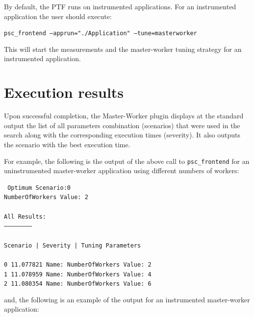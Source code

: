 \documentclass[11pt,a4paper, oneside]{book} %
\newenvironment{code}%
{
\addtolength{\leftskip}{0.5cm}}%
{

}
\begin{document}
By default, the PTF runs on instrumented applications.
For an instrumented application the user should execute:
\vspace*{0.5cm}

\texttt{psc\_frontend --apprun="./Application" --tune=masterworker }

\vspace*{0.5cm}
This will start the measurements and the master-worker tuning strategy for an instrumented application.

\section{Execution results}
Upon successful completion, the Master-Worker plugin displays at the standard output the list of all parameters combination (scenarios) that were used in the search along with the corresponding execution times (severity). It also outputs the scenario with the best execution time.

For example, the following is the output of the above call to \texttt{psc\_frontend} for an uninstrumented master-worker application using different numbers of workers:

\begin{code}
\texttt{
Optimum Scenario:0  \\
NumberOfWorkers Value: 2 \\
\\
All Results:\\
-----------------------\\
\\
Scenario	|  Severity	| Tuning Parameters\\
\\
 0		 	 11.077821	 Name: NumberOfWorkers Value: 2	 \\
 1		 	 11.078959	 Name: NumberOfWorkers Value: 4	 \\
 2		  	 11.080354	 Name: NumberOfWorkers Value: 6	
\\
}

\end{code}

and, the following is an example of the output for an instrumented master-worker application:
\end{document}
